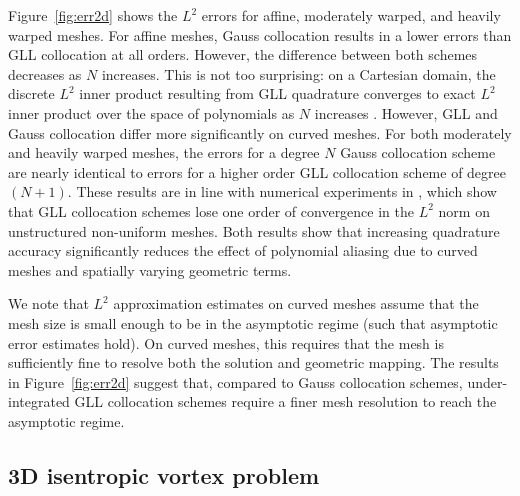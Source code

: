 \documentclass[review,onefignum,onetabnum,final]{siamart171218}
\begin{document}
Figure~\ref{fig:err2d} shows the $L^2$ errors for affine, moderately warped, and heavily warped meshes.  For affine meshes, Gauss collocation results in a lower errors than GLL collocation at all orders.  However, the difference between both schemes decreases as $N$ increases.  This is not too surprising: on a Cartesian domain, the discrete $L^2$ inner product resulting from GLL quadrature converges to exact $L^2$ inner product over the space of polynomials as $N$ increases \cite{quarteroni1994introduction}.  However, GLL and Gauss collocation differ more significantly on curved meshes.  For both moderately and heavily warped meshes, the errors for a degree $N$ Gauss collocation scheme are nearly identical to errors for a higher order GLL collocation scheme of degree $(N+1)$.  These results are in line with numerical experiments in \cite{parsani2016entropy}, which show that GLL collocation schemes lose one order of convergence in the $L^2$ norm on unstructured non-uniform meshes.  Both results show that increasing quadrature accuracy significantly reduces the effect of polynomial aliasing due to curved meshes and spatially varying geometric terms.  

We note that $L^2$ approximation estimates on curved meshes \cite{lenoir1986optimal, warburton2013low} assume that the mesh size is small enough to be in the asymptotic regime (such that asymptotic error estimates hold).  On curved meshes, this requires that the mesh is sufficiently fine to resolve both the solution and geometric mapping.   The results in Figure~\ref{fig:err2d} suggest that, compared to Gauss collocation schemes, under-integrated GLL collocation schemes require a finer mesh resolution to reach the asymptotic regime.  

\subsection{3D isentropic vortex problem}
\end{document}
